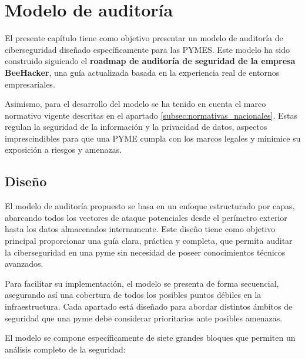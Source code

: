 \documentclass[a4paper, 10pt]{article}
\begin{document}
\clearpage



\section{Modelo de auditoría}

El presente capítulo tiene como objetivo presentar un modelo de auditoría de ciberseguridad diseñado específicamente para las PYMES. Este modelo ha sido construido siguiendo el \textbf{roadmap de auditoría de seguridad de la empresa BeeHacker}, 
una guía actualizada basada en la experiencia real de entornos empresariales. 
\par\vspace{0.5cm}

Asimismo, para el desarrollo del modelo se ha tenido en cuenta el marco normativo vigente descritas en el apartado \ref{subsec:normativas_nacionales}. 
Estas regulan la seguridad de la información y la privacidad de datos, aspectos imprescindibles para que una PYME cumpla con los marcos legales y minimice su exposición a riesgos y amenazas.
\subsection{Diseño}

El modelo de auditoría propuesto se basa en un enfoque estructurado por capas, abarcando todos los vectores de ataque 
potenciales desde el perímetro exterior hasta los datos almacenados internamente. 
Este diseño tiene como objetivo principal proporcionar una guía clara, práctica y completa, que permita 
auditar la ciberseguridad en una pyme sin necesidad de poseer conocimientos técnicos avanzados. 

\par\vspace{0.5cm}

Para facilitar su implementación, el modelo se presenta de forma  secuencial, asegurando así una cobertura de todos los posibles puntos débiles en la infraestructura.
Cada apartado está diseñado para abordar distintos ámbitos de seguridad que una pyme debe considerar prioritarios ante posibles amenazas.

\par\vspace{0.5cm}

El modelo se compone específicamente de siete grandes bloques que permiten un análisis completo de la seguridad:
\end{document}
